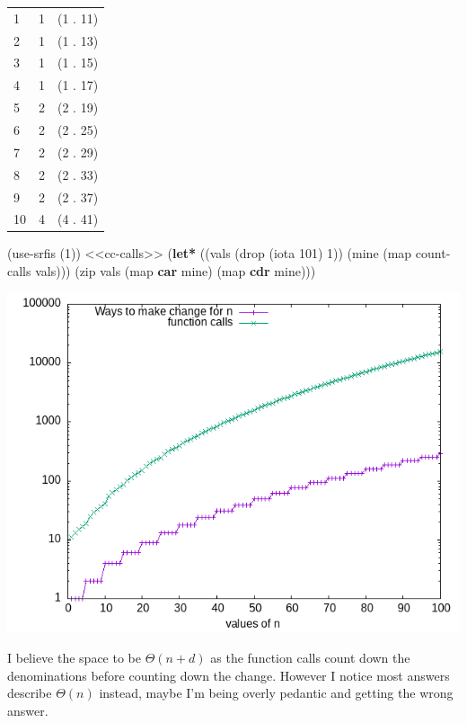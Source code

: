 \documentclass[
]{article}
\newenvironment{Shaded}{}{}
\newcommand{\DecValTok}[1]{\textcolor[rgb]{0.25,0.63,0.44}{#1}}
\newcommand{\KeywordTok}[1]{\textcolor[rgb]{0.00,0.44,0.13}{\textbf{#1}}}
\newcommand{\NormalTok}[1]{#1}
\begin{document}
\begin{longtable}[]{@{}lll@{}}
\toprule
\endhead
1 & 1 & (1 . 11) \\
2 & 1 & (1 . 13) \\
3 & 1 & (1 . 15) \\
4 & 1 & (1 . 17) \\
5 & 2 & (2 . 19) \\
6 & 2 & (2 . 25) \\
7 & 2 & (2 . 29) \\
8 & 2 & (2 . 33) \\
9 & 2 & (2 . 37) \\
10 & 4 & (4 . 41) \\
\bottomrule
\end{longtable}

\hypertarget{cc-calls-100}{%
\label{cc-calls-100}}%
\begin{Shaded}
\begin{Highlighting}[numbers=left,,]
\NormalTok{(use{-}srfis \textquotesingle{}(}\DecValTok{1}\NormalTok{))}
\NormalTok{\textless{}\textless{}cc{-}calls\textgreater{}\textgreater{}}
\NormalTok{(}\KeywordTok{let*}\NormalTok{ ((vals (drop (iota }\DecValTok{101}\NormalTok{) }\DecValTok{1}\NormalTok{))}
\NormalTok{       (mine (map count{-}calls vals)))}
\NormalTok{  (zip vals (map }\KeywordTok{car}\NormalTok{ mine) (map }\KeywordTok{cdr}\NormalTok{ mine)))}
\end{Highlighting}
\end{Shaded}

\includegraphics{fig/cc-100.png}

I believe the space to be \(\Theta(n+d)\) as the function calls count
down the denominations before counting down the change. However I notice
most answers describe \(\Theta(n)\) instead, maybe I'm being overly
pedantic and getting the wrong answer.
\end{document}
